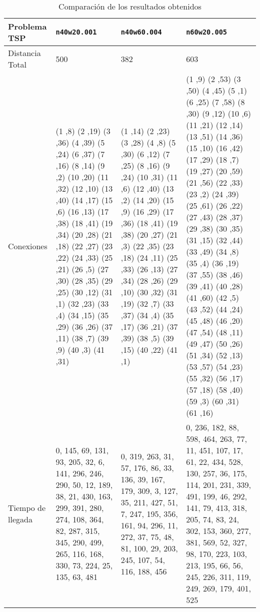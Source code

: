 \documentclass[a4paper,11pt]{article}
\begin{document}
\begin{table}[!htbp]
\label{results_tsptw}
\centering
\begin{tabularx}{\textwidth}{|p{2cm}|X|X|X|}
\hline
Problema TSP    & \texttt{n40w20.001}   & \texttt{n40w60.004}   & \texttt{n60w20.005}	\\ \hline
Distancia Total & 500	& 382	& 603	\\ \hline
Conexiones    & (1 ,8) (2 ,19) (3 ,36) (4 ,39) (5 ,24) (6 ,37) (7 ,16) (8 ,14) (9 ,2) (10 ,20) (11 ,32) (12 ,10) (13 ,40) (14 ,17) (15 ,6) (16 ,13) (17 ,38) (18 ,41) (19 ,34) (20 ,28) (21 ,18) (22 ,27) (23 ,22) (24 ,33) (25 ,21) (26 ,5) (27 ,30) (28 ,35) (29 ,25) (30 ,12) (31 ,1) (32 ,23) (33 ,4) (34 ,15) (35 ,29) (36 ,26) (37 ,11) (38 ,7) (39 ,9) (40 ,3) (41 ,31)	& (1 ,14) (2 ,23) (3 ,28) (4 ,8) (5 ,30) (6 ,12) (7 ,25) (8 ,16) (9 ,24) (10 ,31) (11 ,6) (12 ,40) (13 ,2) (14 ,20) (15 ,9) (16 ,29) (17 ,36) (18 ,41) (19 ,38) (20 ,27) (21 ,3) (22 ,35) (23 ,18) (24 ,11) (25 ,33) (26 ,13) (27 ,34) (28 ,26) (29 ,10) (30 ,32) (31 ,19) (32 ,7) (33 ,37) (34 ,4) (35 ,17) (36 ,21) (37 ,39) (38 ,5) (39 ,15) (40 ,22) (41 ,1)	& (1 ,9) (2 ,53) (3 ,50) (4 ,45) (5 ,1) (6 ,25) (7 ,58) (8 ,30) (9 ,12) (10 ,6) (11 ,21) (12 ,14) (13 ,51) (14 ,36) (15 ,10) (16 ,42) (17 ,29) (18 ,7) (19 ,27) (20 ,59) (21 ,56) (22 ,33) (23 ,2) (24 ,39) (25 ,61) (26 ,22) (27 ,43) (28 ,37) (29 ,38) (30 ,35) (31 ,15) (32 ,44) (33 ,49) (34 ,8) (35 ,4) (36 ,19) (37 ,55) (38 ,46) (39 ,41) (40 ,28) (41 ,60) (42 ,5) (43 ,52) (44 ,24) (45 ,48) (46 ,20) (47 ,54) (48 ,11) (49 ,47) (50 ,26) (51 ,34) (52 ,13) (53 ,57) (54 ,23) (55 ,32) (56 ,17) (57 ,18) (58 ,40) (59 ,3) (60 ,31) (61 ,16)	\\ \hline
Tiempo de llegada & 0, 145, 69, 131, 93, 205, 32, 6, 141, 296, 246, 290, 50, 12, 189, 38, 21, 430, 163, 299, 391, 280, 274, 108, 364, 82, 287, 315, 345, 290, 499, 265, 116, 168, 330, 73, 224, 25, 135, 63, 481	& 0, 319, 263, 31, 57, 176, 86, 33, 136, 39, 167, 179, 309, 3, 127, 35, 211, 427, 51, 7, 247, 195, 356, 161, 94, 296, 11, 272, 37, 75, 48, 81, 100, 29, 203, 245, 107, 54, 116, 188, 456	& 0, 236, 182, 88, 598, 464, 263, 77, 11, 451, 107, 17, 61, 22, 434, 528, 130, 257, 36, 175, 114, 201, 231, 339, 491, 199, 46, 292, 141, 79, 413, 318, 205, 74, 83, 24, 302, 153, 360, 277, 381, 569, 52, 327, 98, 170, 223, 103, 213, 195, 66, 56, 245, 226, 311, 119, 249, 269, 179, 401, 525	\\ \hline
\end{tabularx}
\caption{Comparación de los resultados obtenidos}
\end{table}
\end{document}
